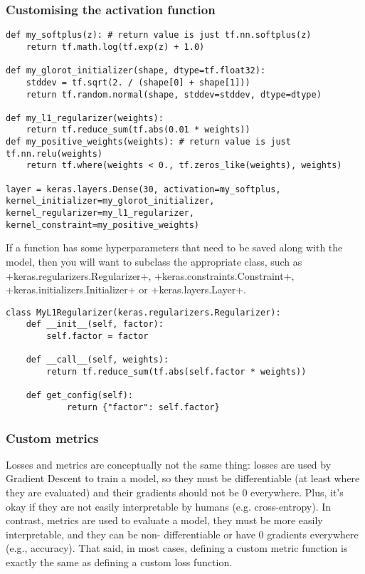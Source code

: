 \subsubsection{Customising the activation function}
\begin{lstlisting}
def my_softplus(z): # return value is just tf.nn.softplus(z) 
	return tf.math.log(tf.exp(z) + 1.0)

def my_glorot_initializer(shape, dtype=tf.float32):
	stddev = tf.sqrt(2. / (shape[0] + shape[1]))
	return tf.random.normal(shape, stddev=stddev, dtype=dtype)

def my_l1_regularizer(weights):
	return tf.reduce_sum(tf.abs(0.01 * weights))
def my_positive_weights(weights): # return value is just tf.nn.relu(weights)
	return tf.where(weights < 0., tf.zeros_like(weights), weights)

layer = keras.layers.Dense(30, activation=my_softplus, kernel_initializer=my_glorot_initializer, kernel_regularizer=my_l1_regularizer, kernel_constraint=my_positive_weights)
\end{lstlisting}
If a function has some hyperparameters that need to be saved along with the model, then you will want to subclass the appropriate class, such as \cd+keras.regularizers.Regularizer+, \cd+keras.constraints.Constraint+, \cd+keras.initializers.Initializer+ or \cd+keras.layers.Layer+.
\begin{lstlisting}
class MyL1Regularizer(keras.regularizers.Regularizer): 
	def __init__(self, factor):
		self.factor = factor 
	
	def __call__(self, weights):
		return tf.reduce_sum(tf.abs(self.factor * weights))
	
	def get_config(self):
			return {"factor": self.factor}
\end{lstlisting}

\subsubsection{Custom metrics}
Losses and metrics are conceptually not the same thing: losses are used by Gradient Descent to train a model, so they must be differentiable (at least where they are evaluated) and their gradients should not be $0$ everywhere. Plus, it's okay if they are not easily interpretable by humans (e.g. cross-entropy). In contrast, metrics are used to evaluate a model, they must be more easily interpretable, and they can be non- differentiable or have 0 gradients everywhere (e.g., accuracy). That said, in most cases, defining a custom metric function is exactly the same as defining a custom loss function.

